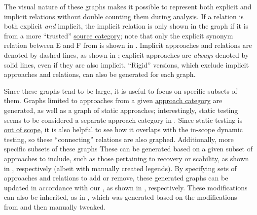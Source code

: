 {        The visual nature of these graphs makes it possible to represent both
        explicit and implicit relations without double counting them during
        \hyperref[discrep-analysis]{analysis}.
        If a relation is both explicit \emph{and} implicit, the implicit relation
        is only shown in the graph if it is from a more ``trusted''
        \hyperref[sources]{source category}; note that only the explicit
        synonym relation between E and F
        from  is shown in .
        Implicit approaches and relations are denoted by dashed lines, as shown
        in ; explicit approaches are
        \emph{always} denoted by solid lines, even if they are also implicit.
        ``Rigid'' versions, which exclude implicit approaches and relations,
        can also be generated for each graph.

    \fi
    Since these graphs tend to be large, it is useful to focus on specific
    subsets of them. \ifnotpaper Graphs limited to approaches from a given
        \hyperref[categories-observ]{approach category} are generated, as well
        as a graph of static approaches; interestingly, static testing seems to
        be considered a separate approach category in \citep[Fig.~2]{IEEE2022}%
        . Since static testing is
        \hyperref[static-test]{out of scope}, it is also helpful to see how it
        overlaps with the in-scope dynamic testing, so these ``connecting''
        relations are also graphed. Additionally, more specific subsets of
        these graphs \else These \fi can be generated based on a given subset
    of approaches to include, such as those pertaining to
    \hyperref[recov-discrep]{recovery} or \hyperref[scal-discrep]{scability},
    as shown in ,
    respectively (albeit with manually created legends). By specifying sets of
    approaches and relations to add or remove, these generated graphs can be
    updated in accordance with our , as shown in
    , respectively.
    These modifications can also be inherited, as in ,
    which was generated based on the modifications from
     and then
    manually tweaked.}


